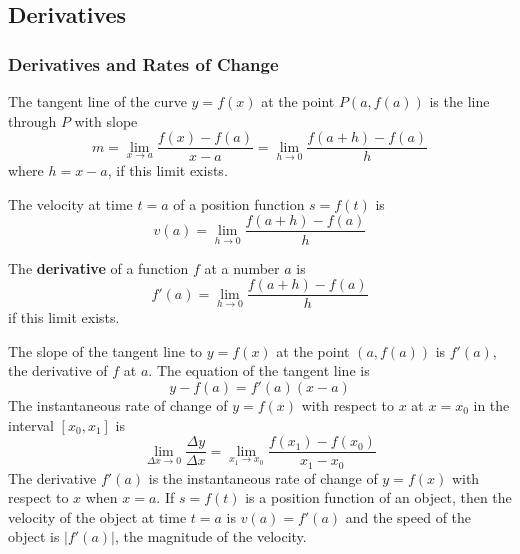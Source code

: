 \subsection{Derivatives}

\subsubsection*{Derivatives and Rates of Change}
\begin{definition}
    The tangent line of the curve \(y=f(x)\) at the point \(P(a, f(a))\) is
    the line through \(P\) with slope
    \[m=\lim_{x\to a}\frac{f(x)-f(a)}{x-a}
    =\lim_{h\to 0}\frac{f(a+h)-f(a)}{h}\]
    where \(h=x-a\), if this limit exists.
\end{definition}
\begin{definition}
    The velocity at time \(t=a\) of a position function \(s=f(t)\) is
    \[v(a)=\lim_{h\to 0}\frac{f(a+h)-f(a)}{h}\]
\end{definition}
\begin{definition}
    The \textbf{derivative} of a function \(f\) at a number \(a\) is
    \[f'(a)=\lim_{h\to 0}\frac{f(a+h)-f(a)}{h}\]
    if this limit exists.
\end{definition}
The slope of the tangent line to \(y=f(x)\) at the point \((a,f(a))\) is
\(f'(a)\), the derivative of \(f\) at \(a\).
The equation of the tangent line is
\[y-f(a)=f'(a)(x-a)\]
The instantaneous rate of change of \(y=f(x)\) with respect to \(x\) at
\(x=x_0\) in the interval \([x_0,x_1]\) is
\[\lim_{\Delta x\to 0}\frac{\Delta y}{\Delta x}
=\lim_{x_1 \to x_0}\frac{f(x_1)-f(x_0)}{x_1-x_0}\]
The derivative \(f'(a)\) is the instantaneous rate of change of \(y=f(x)\)
with respect to \(x\) when \(x=a\).
If \(s=f(t)\) is a position function of an object, then the velocity of the
object at time \(t=a\) is \(v(a)=f'(a)\) and the speed of the object is
\(|f'(a)|\), the magnitude of the velocity.

